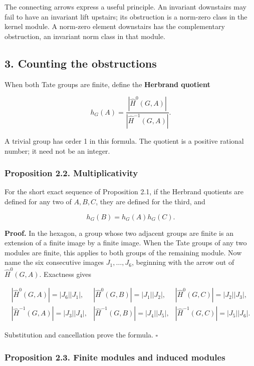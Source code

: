\documentclass[11pt,a4paper]{article}
\begin{document}
The connecting arrows express a useful principle. An invariant
downstairs may fail to have an invariant lift upstairs; its obstruction
is a norm-zero class in the kernel module. A norm-zero element
downstairs has the complementary obstruction, an invariant norm class in
that module.

\subsection{3. Counting the
obstructions}\label{counting-the-obstructions}

When both Tate groups are finite, define the \textbf{Herbrand quotient}

\[
h_G(A)=\frac{|\widehat H^0(G,A)|}{|\widehat H^{-1}(G,A)|}.
\]

A trivial group has order 1 in this formula. The quotient is a positive
rational number; it need not be an integer.

\subsubsection{Proposition 2.2.
Multiplicativity}\label{proposition-2.2.-multiplicativity}

For the short exact sequence of Proposition 2.1, if the Herbrand
quotients are defined for any two of \(A,B,C\), they are defined for the
third, and

\[
h_G(B)=h_G(A)h_G(C).
\]

\textbf{Proof.} In the hexagon, a group whose two adjacent groups are
finite is an extension of a finite image by a finite image. When the
Tate groups of any two modules are finite, this applies to both groups
of the remaining module. Now name the six consecutive images
\(J_1,\ldots,J_6\), beginning with the arrow out of
\(\widehat H^0(G,A)\). Exactness gives

\[
\begin{array}{lll}
|\widehat H^0(G,A)|=|J_6||J_1|,&
|\widehat H^0(G,B)|=|J_1||J_2|,&
|\widehat H^0(G,C)|=|J_2||J_3|,\\
|\widehat H^{-1}(G,A)|=|J_3||J_4|,&
|\widehat H^{-1}(G,B)|=|J_4||J_5|,&
|\widehat H^{-1}(G,C)|=|J_5||J_6|.
\end{array}
\]

Substitution and cancellation prove the formula. \(\square\)

\subsubsection{Proposition 2.3. Finite modules and induced
modules}\label{proposition-2.3.-finite-modules-and-induced-modules}
\end{document}
